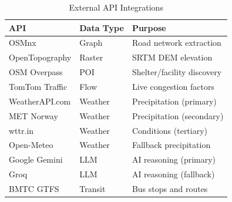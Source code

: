 \documentclass[journal]{IEEEtran}
\begin{document}
\begin{table}[!t]
    \centering
    \caption{External API Integrations}
    \label{tab:apis}
    \begin{tabular}{@{}llp{3cm}@{}}
        \toprule
        \textbf{API} & \textbf{Data Type} & \textbf{Purpose} \\
        \midrule
        OSMnx & Graph & Road network extraction \\
        OpenTopography & Raster & SRTM DEM elevation \\
        OSM Overpass & POI & Shelter/facility discovery \\
        TomTom Traffic & Flow & Live congestion factors \\
        WeatherAPI.com & Weather & Precipitation (primary) \\
        MET Norway & Weather & Precipitation (secondary) \\
        wttr.in & Weather & Conditions (tertiary) \\
        Open-Meteo & Weather & Fallback precipitation \\
        Google Gemini & LLM & AI reasoning (primary) \\
        Groq & LLM & AI reasoning (fallback) \\
        BMTC GTFS & Transit & Bus stops and routes \\
        \bottomrule
    \end{tabular}
\end{table}

\balance


\end{document}
